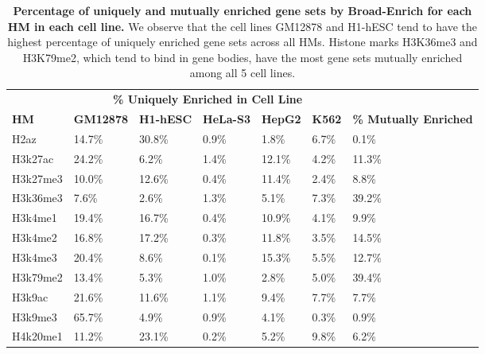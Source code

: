 \begin{table}[!ht]
\small
\centering
\begin{tabular}{l|lllll|l}
            & \multicolumn{5}{c}{\textbf{\% Uniquely Enriched in Cell Line}}                          & \multicolumn{1}{c}{}          \\
\textbf{HM} & \textbf{GM12878} & \textbf{H1-hESC} & \textbf{HeLa-S3} & \textbf{HepG2} & \textbf{K562} & \textbf{\% Mutually Enriched} \\\hline
H2az        & 14.7\%           & 30.8\%           & 0.9\%            & 1.8\%          & 6.7\%         & 0.1\%                         \\
H3k27ac     & 24.2\%           & 6.2\%            & 1.4\%            & 12.1\%         & 4.2\%         & 11.3\%                        \\
H3k27me3    & 10.0\%           & 12.6\%           & 0.4\%            & 11.4\%         & 2.4\%         & 8.8\%                         \\
H3k36me3    & 7.6\%            & 2.6\%            & 1.3\%            & 5.1\%          & 7.3\%         & 39.2\%                        \\
H3k4me1     & 19.4\%           & 16.7\%           & 0.4\%            & 10.9\%         & 4.1\%         & 9.9\%                         \\
H3k4me2     & 16.8\%           & 17.2\%           & 0.3\%            & 11.8\%         & 3.5\%         & 14.5\%                        \\
H3k4me3     & 20.4\%           & 8.6\%            & 0.1\%            & 15.3\%         & 5.5\%         & 12.7\%                        \\
H3k79me2    & 13.4\%           & 5.3\%            & 1.0\%            & 2.8\%          & 5.0\%         & 39.4\%                        \\
H3k9ac      & 21.6\%           & 11.6\%           & 1.1\%            & 9.4\%          & 7.7\%         & 7.7\%                         \\
H3k9me3     & 65.7\%           & 4.9\%            & 0.9\%            & 4.1\%          & 0.3\%         & 0.9\%                         \\
H4k20me1    & 11.2\%           & 23.1\%           & 0.2\%            & 5.2\%          & 9.8\%         & 6.2\%
\end{tabular}
\normalsize
\caption[Percentage of uniquely and mutually enriched gene sets by Broad-Enrich for each HM in each cell line.]
{
\textbf{Percentage of uniquely and mutually enriched gene sets by Broad-Enrich for each HM in each cell line.}
We observe that the cell lines GM12878 and H1-hESC tend to have the highest percentage of uniquely enriched gene sets across all HMs. Histone marks H3K36me3 and H3K79me2, which tend to bind in gene bodies, have the most gene sets mutually enriched among all 5 cell lines.
}
\label{chap2:table:3}

\end{table}


